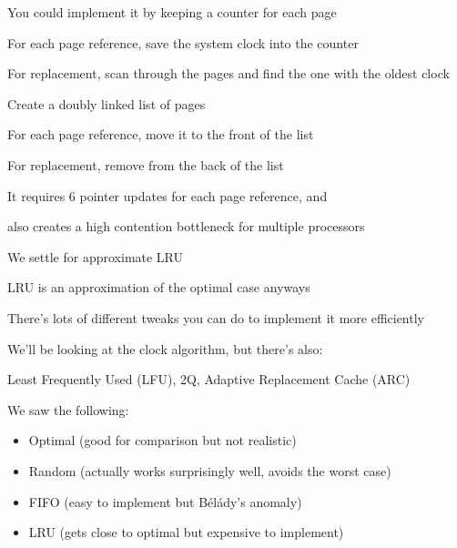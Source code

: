 \begin{slide}


    You could implement it by keeping a counter for each page
    \medskip

    For each page reference, save the system clock into the counter
    \medskip


    For replacement, scan through the pages and find the one with the oldest clock

\end{slide}

\begin{slide}


    Create a doubly linked list of pages
    \medskip

    For each page reference, move it to the front of the list
    \medskip

    For replacement, remove from the back of the list
    \medskip

    It requires 6 pointer updates for each page reference, and

    \leftspace{}also creates a high contention bottleneck for multiple processors

\end{slide}

\begin{slide}


    We settle for approximate LRU

    \leftspace{}LRU is an approximation of the optimal case anyways
    \medskip

    There's lots of different tweaks you can do to implement it more efficiently
    \medskip

    We'll be looking at the clock algorithm, but there's also:

    \leftspace{}Least Frequently Used (LFU), 2Q, Adaptive Replacement Cache (ARC)

\end{slide}

\begin{slide}


    We saw the following:
    \begin{itemize}
      \item Optimal (good for comparison but not realistic)
      \item Random (actually works surprisingly well, avoids the worst case)
      \item FIFO (easy to implement but Bélády's anomaly)
      \item LRU (gets close to optimal but expensive to implement)
    \end{itemize}

\end{slide}


